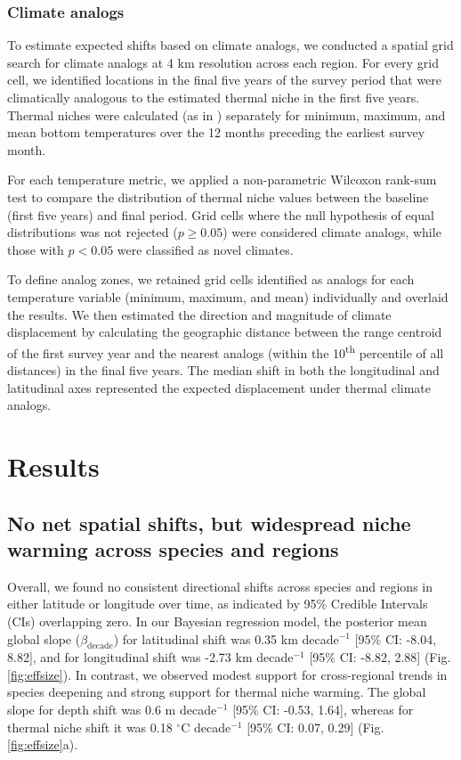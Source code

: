 \documentclass[11pt]{article}
\begin{document}
\begin{spacing}{1.5}
\subsubsection{Climate analogs}

To estimate expected shifts based on climate analogs, we conducted a spatial grid search for climate analogs at 4 km resolution across each region. For every grid cell, we identified locations in the final five years of the survey period that were climatically analogous to the estimated thermal niche in the first five years. Thermal niches were calculated (as in \textit{}) separately for minimum, maximum, and mean bottom temperatures over the 12 months preceding the earliest survey month.

For each temperature metric, we applied a non-parametric Wilcoxon rank-sum test to compare the distribution of thermal niche values between the baseline (first five years) and final period. Grid cells where the null hypothesis of equal distributions was not rejected ($p \geq 0.05$) were considered climate analogs, while those with $p < 0.05$ were classified as novel climates.

To define analog zones, we retained grid cells identified as analogs for each temperature variable (minimum, maximum, and mean) individually and overlaid the results. We then estimated the direction and magnitude of climate displacement by calculating the geographic distance between the range centroid of the first survey year and the nearest analogs (within the 10\textsuperscript{th} percentile of all distances) in the final five years. The median shift in both the longitudinal and latitudinal axes represented the expected displacement under thermal climate analogs.


\newpage

\section{Results}

\subsection{No net spatial shifts, but widespread niche warming across species and regions}

Overall, we found no consistent directional shifts across species and regions in either latitude or longitude over time, as indicated by 95\% Credible Intervals (CIs) overlapping zero. In our Bayesian regression model, the posterior mean global slope ($\beta_{\text{decade}}$) for latitudinal shift was 0.35 km decade$^{-1}$ [95\% CI: -8.04, 8.82], and for longitudinal shift was -2.73 km decade$^{-1}$ [95\% CI: -8.82, 2.88] (Fig. \ref{fig:effsize}). In contrast, we observed modest support for cross-regional trends in species deepening and strong support for thermal niche warming. The global slope for depth shift was 0.6 m decade$^{-1}$ [95\% CI: -0.53, 1.64], whereas for thermal niche shift it was 0.18 $^{\circ}$C decade$^{-1}$ [95\% CI: 0.07, 0.29] (Fig. \ref{fig:effsize}a).



\end{spacing}
\end{document}
